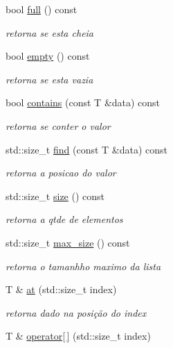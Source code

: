 \begin{DoxyCompactItemize}
bool \mbox{\hyperlink{classstructures_1_1ArrayList_a4bf1b945b8e6914ce8988dc0bbb6fc66}{full}} () const
\begin{DoxyCompactList}\small\item\em retorna se esta cheia \end{DoxyCompactList}\item 
bool \mbox{\hyperlink{classstructures_1_1ArrayList_ae63920a127efd82e610e72b3ef5d681f}{empty}} () const
\begin{DoxyCompactList}\small\item\em retorna se esta vazia \end{DoxyCompactList}\item 
bool \mbox{\hyperlink{classstructures_1_1ArrayList_ac8783a85dfd89c6e7e779b33ab475d71}{contains}} (const T \&data) const
\begin{DoxyCompactList}\small\item\em retorna se conter o valor \end{DoxyCompactList}\item 
std\+::size\+\_\+t \mbox{\hyperlink{classstructures_1_1ArrayList_a00be80d3ae698b91d485507f44d82e84}{find}} (const T \&data) const
\begin{DoxyCompactList}\small\item\em retorna a posicao do valor \end{DoxyCompactList}\item 
std\+::size\+\_\+t \mbox{\hyperlink{classstructures_1_1ArrayList_ab3ed0971900e42d5009992a2e381a95a}{size}} () const
\begin{DoxyCompactList}\small\item\em retorna a qtde de elementos \end{DoxyCompactList}\item 
std\+::size\+\_\+t \mbox{\hyperlink{classstructures_1_1ArrayList_a8f0772886f296281ea03af9578f67969}{max\+\_\+size}} () const
\begin{DoxyCompactList}\small\item\em retorna o tamanhho maximo da lista \end{DoxyCompactList}\item 
T \& \mbox{\hyperlink{classstructures_1_1ArrayList_ac21118842acb1131b3b64569c1e5c732}{at}} (std\+::size\+\_\+t index)
\begin{DoxyCompactList}\small\item\em retorna dado na posição do index \end{DoxyCompactList}\item 
T \& \mbox{\hyperlink{classstructures_1_1ArrayList_a1ff71f9c1ebce9408c52115651ab4e77}{operator\mbox{[}$\,$\mbox{]}}} (std\+::size\+\_\+t index)

\end{DoxyCompactItemize}
